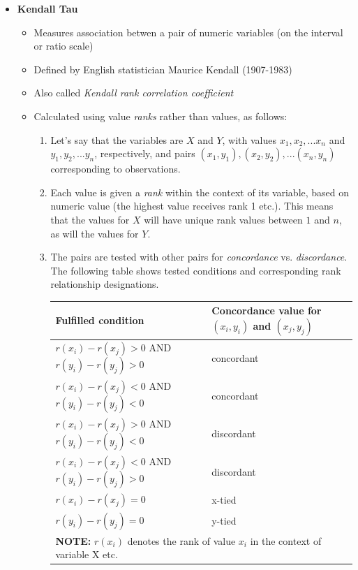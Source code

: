 \begin{itemize}
  
\item \textbf{Kendall Tau}
  \begin{itemize}
  \item Measures association betwen a pair of numeric variables (on the interval or ratio scale)
  \item Defined by English statistician Maurice Kendall (1907-1983)
  \item Also called \emph{Kendall rank correlation coefficient}
  \item Calculated using value \emph{ranks} rather than values, as follows:
    \begin{enumerate}
    \item Let's say that the variables are $X$ and $Y$, with values $x_1, x_2, ... x_n$ and  $y_1, y_2, ... y_n$, respectively, and pairs ${(x_1,y_1), (x_2, y_2), ... (x_n, y_n)}$ corresponding to observations. 
    \item Each value is given a \emph{rank} within the context of its variable, based on numeric value (the highest value receives rank 1 etc.). This means that the values for $X$ will have unique rank values between $1$ and $n$, as will the values for $Y$.  
    \item The pairs are tested with other pairs for \emph{concordance} vs. \emph{discordance}. The following table shows tested conditions and corresponding rank relationship designations.
\newpage
      {\tiny \setlength\extrarowheight{0.5em}
      \begin{tabular}{ll}
      \hline
      \textbf{Fulfilled condition} & \textbf{Concordance value for} \textbf{$(x_i, y_i)$ and $(x_j, y_j)$} \\
      \hline
      $r(x_i)-r(x_j) > 0$ AND $r(y_i)-r(y_j) > 0$ & concordant \\
      $r(x_i)-r(x_j) < 0$ AND $r(y_i)-r(y_j) < 0$ & concordant \\
      $r(x_i)-r(x_j) > 0$ AND $r(y_i)-r(y_j) < 0$ & discordant \\
      $r(x_i)-r(x_j) < 0$ AND $r(y_i)-r(y_j) > 0$ & discordant \\
      $r(x_i)-r(x_j) = 0$ & x-tied \\
      $r(y_i)-r(y_j) = 0$ & y-tied \\
      \hline
      \multicolumn{2}{l}{\textbf{NOTE:} $r(x_i)$ denotes the rank of value $x_i$ in the context of variable X etc.}\\

\end{tabular}}
\end{enumerate}
\end{itemize}
\end{itemize}
